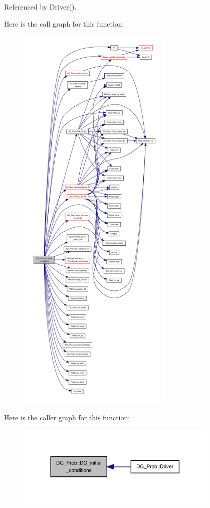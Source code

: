 Referenced by Driver().

Here is the call graph for this function\+:
\nopagebreak
\begin{figure}[H]
\begin{center}
\leavevmode
\includegraphics[height=550pt]{classDG__Prob_a8241ca6884495f863179ea86129b055e_cgraph}
\end{center}
\end{figure}
Here is the caller graph for this function\+:
\nopagebreak
\begin{figure}[H]
\begin{center}
\leavevmode
\includegraphics[width=272pt]{classDG__Prob_a8241ca6884495f863179ea86129b055e_icgraph}
\end{center}
\end{figure}
\mbox{\label{classDG__Prob_ac4dfaa4ea6466833ecb5cc5c3fcb3875}} 
